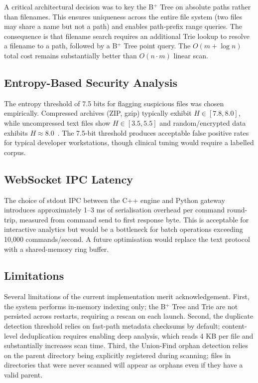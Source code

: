 \documentclass[conference]{IEEEtran}
\begin{document}
A critical architectural decision was to key the B$^+$ Tree on absolute paths rather than filenames. This ensures uniqueness across the entire file system (two files may share a name but not a path) and enables path-prefix range queries. The consequence is that filename search requires an additional Trie lookup to resolve a filename to a path, followed by a B$^+$ Tree point query. The $O(m + \log n)$ total cost remains substantially better than $O(n \cdot m)$ linear scan.

\subsection{Entropy-Based Security Analysis}

The entropy threshold of 7.5 bits for flagging suspicious files was chosen empirically. Compressed archives (ZIP, gzip) typically exhibit $H \in [7.8, 8.0]$, while uncompressed text files show $H \in [3.5, 5.5]$ and random/encrypted data exhibits $H \approx 8.0$~\cite{idika2007survey}. The 7.5-bit threshold produces acceptable false positive rates for typical developer workstations, though clinical tuning would require a labelled corpus.

\subsection{WebSocket IPC Latency}

The choice of stdout IPC between the C++ engine and Python gateway introduces approximately 1--3 ms of serialisation overhead per command round-trip, measured from command send to first response byte. This is acceptable for interactive analytics but would be a bottleneck for batch operations exceeding 10{,}000 commands/second. A future optimisation would replace the text protocol with a shared-memory ring buffer.

\subsection{Limitations}

Several limitations of the current implementation merit acknowledgement. First, the system performs in-memory indexing only; the B$^+$ Tree and Trie are not persisted across restarts, requiring a rescan on each launch. Second, the duplicate detection threshold relies on fast-path metadata checksums by default; content-level deduplication requires enabling deep analysis, which reads 4 KB per file and substantially increases scan time. Third, the Union-Find orphan detection relies on the parent directory being explicitly registered during scanning; files in directories that were never scanned will appear as orphans even if they have a valid parent.
\end{document}
